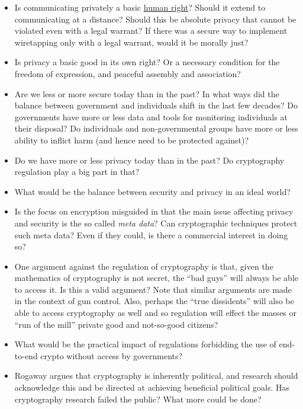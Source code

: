 \begin{itemize}
\item
  Is communicating privately a basic
  \href{http://www.un.org/en/universal-declaration-human-rights/}{human
  right}? Should it extend to communicating at a distance? Should this
  be absolute privacy that cannot be violated even with a legal warrant?
  If there was a secure way to implement wiretapping only with a legal
  warrant, would it be morally just?
\item
  Is privacy a basic good in its own right? Or a necessary condition for
  the freedom of expression, and peaceful assembly and association?
\item
  Are we less or more secure today than in the past? In what ways did
  the balance between government and individuals shift in the last few
  decades? Do governments have more or less data and tools for
  monitoring individuals at their disposal? Do individuals and
  non-governmental groups have more or less ability to inflict harm (and
  hence need to be protected against)?
\item
  Do we have more or less privacy today than in the past? Do
  cryptography regulation play a big part in that?
\item
  What would be the balance between security and privacy in an ideal
  world?
\item
  Is the focus on encryption misguided in that the main issue affecting
  privacy and security is the so called \emph{meta data}? Can
  cryptographic techniques protect such meta data? Even if they could,
  is there a commercial interest in doing so?
\item
  One argument against the regulation of cryptography is that, given the
  mathematics of cryptography is not secret, the ``bad guys'' will
  always be able to access it. Is this a valid argument? Note that
  similar arguments are made in the context of gun control. Also,
  perhaps the ``true dissidents'' will also be able to access
  cryptography as well and so regulation will effect the masses or ``run
  of the mill'' private good and not-so-good citizens?
\item
  What would be the practical impact of regulations forbidding the use
  of end-to-end crypto without access by governments?
\item
  Rogaway argues that cryptography is inherently political, and research
  should acknowledge this and be directed at achieving beneficial
  political goals. Has cryptography research failed the public? What
  more could be done?

\end{itemize}
